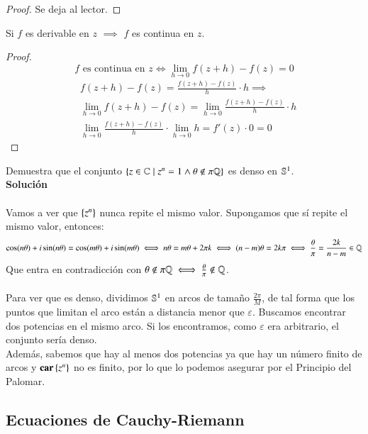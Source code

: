 \begin{proof}
    Se deja al lector.
\end{proof}

\begin{pro}
    Si $f$ es derivable en $z$ $\implies$ $f$ es continua en $z$.
\end{pro}

\begin{proof}
    $$
        f \text{ es continua en } z \iff \lim_{h\to 0} f(z+h) - f(z) = 0
    $$
    \begin{align*}
        & f(z+h) - f(z) = \frac{f(z+h) - f(z)}{h}\cdot h \implies\\
        & \lim_{h\to 0} f(z+h) - f(z) = \lim_{h\to 0}  \frac{f(z+h) - f(z)}{h}\cdot h\\
        & \lim_{h\to 0} \frac{f(z+h) - f(z)}{h} \cdot \lim_{h\to 0} h = f'(z) \cdot 0 = 0
    \end{align*}
\end{proof}

\begin{th_ex}
    Demuestra que el conjunto $\sdf{z \in \C \mid z^n = 1 \land \theta \notin \pi\Q}$ es denso en $\S^1$.\\

    \textbf{Solución}\\\\
    Vamos a ver que $\sdf{z^n}$ nunca repite el mismo valor.
    Supongamos que sí repite el mismo valor, entonces:
    $$
        \cos(n\theta) + i \sin(n\theta) = \cos(m\theta) + i \sin(m\theta) \iff n\theta = m\theta + 2\pi k \iff (n-m)\theta = 2k\pi \iff \frac{\theta}{\pi} = \frac{2k}{n-m} \in \Q
    $$
    Que entra en contradicción con $\theta \notin \pi\Q \iff \frac{\theta}{\pi} \notin \Q$.\\\\
    Para ver que es denso, dividimos $\S^1$ en arcos de tamaño $\frac{2\pi}{M}$, de tal forma que los puntos que limitan el arco están a distancia menor que $\varepsilon$. Buscamos encontrar dos potencias en el mismo arco. Si los encontramos, como $\varepsilon$ era arbitrario, el conjunto sería denso.\\
    Además, sabemos que hay al menos dos potencias ya que hay un número finito de arcos y $\textbf{car}\sdf{z^n}$ no es finito, por lo que lo podemos asegurar por el Principio del Palomar.
\end{th_ex}

\subsection{Ecuaciones de Cauchy-Riemann}

